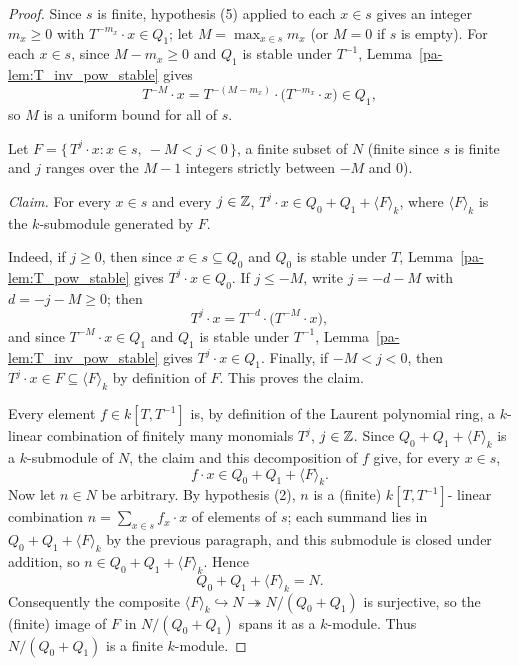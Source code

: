 \begin{proof}
  \leanok
  Since \(s\) is finite, hypothesis (5) applied to each \(x \in s\) gives an integer
  \(m_x \ge 0\) with \(T^{-m_x} \cdot x \in Q_1\); let \(M = \max_{x \in s} m_x\) (or \(M = 0\)
  if \(s\) is empty). For each \(x \in s\), since \(M - m_x \ge 0\) and \(Q_1\) is stable
  under \(T^{-1}\), Lemma~\ref{pa-lem:T_inv_pow_stable} gives
  \[
    T^{-M} \cdot x = T^{-(M - m_x)} \cdot \bigl(T^{-m_x} \cdot x\bigr) \in Q_1 ,
  \]
  so \(M\) is a uniform bound for all of \(s\).

  Let \(F = \{\, T^j \cdot x : x \in s,\ -M < j < 0 \,\}\), a finite subset of \(N\) (finite
  since \(s\) is finite and \(j\) ranges over the \(M - 1\) integers strictly between \(-M\)
  and \(0\)).

  \emph{Claim.} For every \(x \in s\) and every \(j \in \mathbb{Z}\),
  \(T^j \cdot x \in Q_0 + Q_1 + \langle F \rangle_k\), where \(\langle F \rangle_k\) is the
  \(k\)-submodule generated by \(F\).

  Indeed, if \(j \ge 0\), then since \(x \in s \subseteq Q_0\) and \(Q_0\) is stable under
  \(T\), Lemma~\ref{pa-lem:T_pow_stable} gives \(T^j \cdot x \in Q_0\). If \(j \le -M\), write
  \(j = -d - M\) with \(d = -j - M \ge 0\); then
  \[
    T^j \cdot x = T^{-d} \cdot \bigl(T^{-M} \cdot x\bigr) ,
  \]
  and since \(T^{-M} \cdot x \in Q_1\) and \(Q_1\) is stable under \(T^{-1}\),
  Lemma~\ref{pa-lem:T_inv_pow_stable} gives \(T^j \cdot x \in Q_1\). Finally, if \(-M < j < 0\),
  then \(T^j \cdot x \in F \subseteq \langle F \rangle_k\) by definition of \(F\). This proves
  the claim.

  Every element \(f \in k[T,T^{-1}]\) is, by definition of the Laurent polynomial ring, a
  \(k\)-linear combination of finitely many monomials \(T^j\), \(j \in \mathbb{Z}\). Since
  \(Q_0 + Q_1 + \langle F \rangle_k\) is a \(k\)-submodule of \(N\), the claim and this
  decomposition of \(f\) give, for every \(x \in s\),
  \[
    f \cdot x \in Q_0 + Q_1 + \langle F \rangle_k .
  \]
  Now let \(n \in N\) be arbitrary. By hypothesis (2), \(n\) is a (finite) \(k[T,T^{-1}]\)-
  linear combination \(n = \sum_{x \in s} f_x \cdot x\) of elements of \(s\); each summand lies
  in \(Q_0 + Q_1 + \langle F \rangle_k\) by the previous paragraph, and this submodule is
  closed under addition, so \(n \in Q_0 + Q_1 + \langle F \rangle_k\). Hence
  \[
    Q_0 + Q_1 + \langle F \rangle_k = N .
  \]
  Consequently the composite \(\langle F \rangle_k \hookrightarrow N \twoheadrightarrow
  N/(Q_0+Q_1)\) is surjective, so the (finite) image of \(F\) in \(N/(Q_0+Q_1)\) spans it as a
  \(k\)-module. Thus \(N/(Q_0+Q_1)\) is a finite \(k\)-module.
\end{proof}

